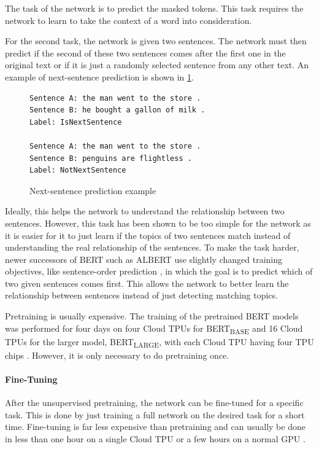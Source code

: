 The task of the network is to predict the masked tokens.
This task requires the network to learn to take the context of a word into consideration.

For the second task, the network is given two sentences.
The network must then predict if the second of these two sentences comes after the first one in the original text or if it is just a randomly selected sentence from any other text.
An example of next-sentence prediction is shown in \cref{fig:bert_next_sentence_example}.

\begin{figure}[h]
\begin{lstlisting}[numbers=none]
Sentence A: the man went to the store .
Sentence B: he bought a gallon of milk .
Label: IsNextSentence

Sentence A: the man went to the store .
Sentence B: penguins are flightless .
Label: NotNextSentence
\end{lstlisting}
\caption[Next-sentence prediction example]{Next-sentence prediction example \cite{bertGithub}}
\label{fig:bert_next_sentence_example}
\end{figure}

Ideally, this helps the network to understand the relationship between two sentences.
However, this task has been shown to be too simple for the network as it is easier for it to just learn if the topics of two sentences match instead of understanding the real relationship of the sentences.
To make the task harder, newer successors of BERT such as ALBERT use slightly changed training objectives, like sentence-order prediction \cite[p.~3]{1909.11942}, in which the goal is to predict which of two given sentences comes first.
This allows the network to better learn the relationship between sentences instead of just detecting matching topics.

Pretraining is usually expensive.
The training of the pretrained BERT models was performed for four days on four Cloud TPUs for BERT\textsubscript{BASE} and 16 Cloud TPUs for the larger model, BERT\textsubscript{LARGE}, with each Cloud TPU having four TPU chips \cite[p.~13]{devlin2018bert}.
However, it is only necessary to do pretraining once.

\paragraph{Fine-Tuning}

After the unsupervised pretraining, the network can be fine-tuned for a specific task.
This is done by just training a full network on the desired task for a short time.
Fine-tuning is far less expensive than pretraining and can usually be done in less than one hour on a single Cloud TPU or a few hours on a normal GPU \cite[p.~5]{devlin2018bert}.

